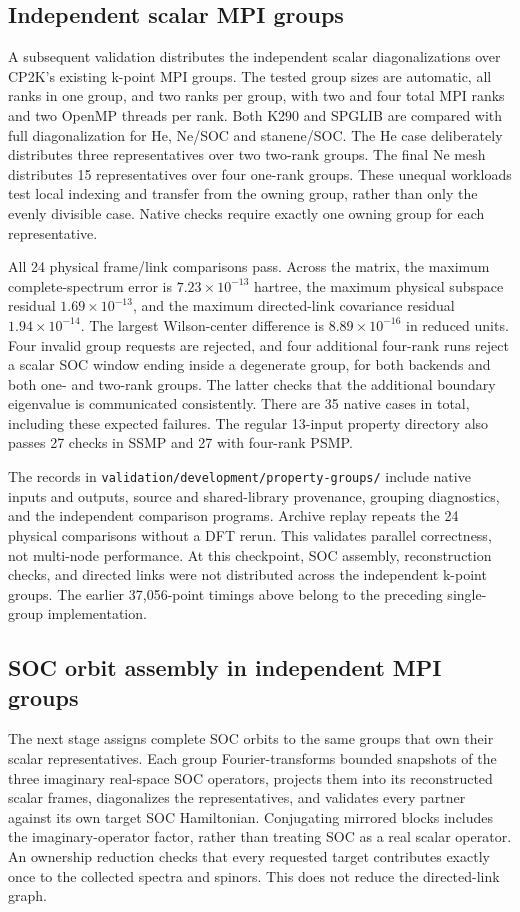 \documentclass[11pt]{article}
\begin{document}
\subsection{Independent scalar MPI groups}
A subsequent validation distributes the independent scalar
diagonalizations over CP2K's existing k-point MPI groups.
The tested group sizes are automatic, all ranks in one group,
and two ranks per group, with two and four total MPI ranks and
two OpenMP threads per rank. Both K290 and SPGLIB are compared
with full diagonalization for He, Ne/SOC and stanene/SOC.
The He case deliberately distributes three representatives over
two two-rank groups. The final Ne mesh distributes 15
representatives over four one-rank groups. These unequal workloads
test local indexing and transfer from the owning group, rather
than only the evenly divisible case. Native checks require exactly
one owning group for each representative.

All 24 physical frame/link comparisons pass. Across the matrix,
the maximum complete-spectrum error is $7.23\times10^{-13}$ hartree,
the maximum physical subspace residual $1.69\times10^{-13}$,
and the maximum directed-link covariance residual
$1.94\times10^{-14}$. The largest Wilson-center difference is
$8.89\times10^{-16}$ in reduced units. Four invalid group requests
are rejected, and four additional four-rank runs reject a scalar
SOC window ending inside a degenerate group, for both backends
and both one- and two-rank groups. The latter checks that the
additional boundary eigenvalue is communicated consistently.
There are 35 native cases in total, including these expected
failures. The regular 13-input property directory also passes
27 checks in SSMP and 27 with four-rank PSMP.

The records in \nolinkurl{validation/development/property-groups/}
include native inputs and outputs, source and shared-library
provenance, grouping diagnostics, and the independent comparison
programs. Archive replay repeats the 24 physical comparisons
without a DFT rerun. This validates parallel correctness, not
multi-node performance. At this checkpoint, SOC assembly, reconstruction
checks, and directed links were not distributed across the
independent k-point groups. The earlier 37,056-point timings
above belong to the preceding single-group implementation.

\subsection{SOC orbit assembly in independent MPI groups}
The next stage assigns complete SOC orbits to the same groups that
own their scalar representatives. Each group Fourier-transforms
bounded snapshots of the three imaginary real-space SOC operators,
projects them into its reconstructed scalar frames, diagonalizes
the representatives, and validates every partner against its own
target SOC Hamiltonian. Conjugating mirrored blocks includes the
imaginary-operator factor, rather than treating SOC as a real
scalar operator. An ownership reduction checks that every requested
target contributes exactly once to the collected spectra and
spinors. This does not reduce the directed-link graph.
\end{document}
